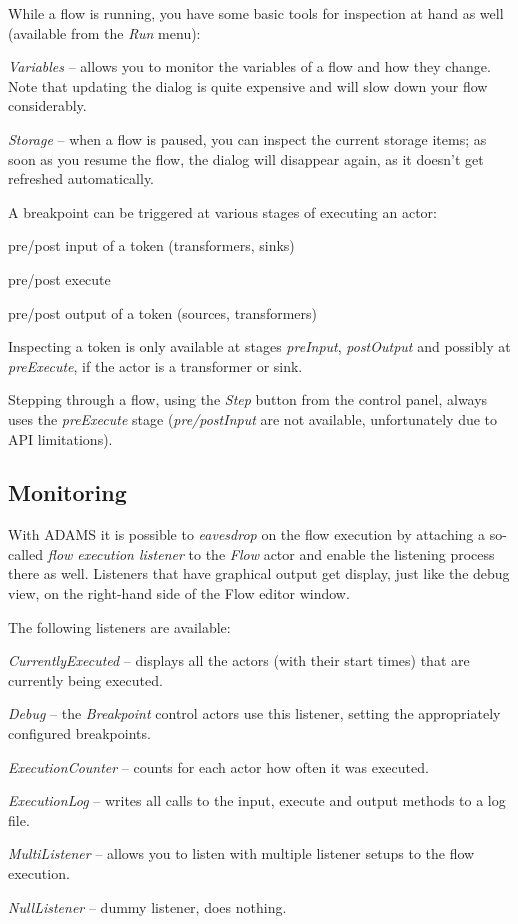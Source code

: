 While a flow is running, you have some basic tools for inspection at hand as 
well (available from the \textit{Run} menu):
\begin{tight_itemize}
	\item \textit{Variables} -- allows you to monitor the variables of a flow
	and how they change. Note that updating the dialog is quite expensive and
	will slow down your flow considerably.
	\item \textit{Storage} -- when a flow is paused, you can inspect the 
	current storage items; as soon as you resume the flow, the dialog will 
	disappear again, as it doesn't get refreshed automatically.
\end{tight_itemize}
A breakpoint can be triggered at various stages of executing an actor:
\begin{tight_itemize}
  \item pre/post input of a token (transformers, sinks)
  \item pre/post execute
  \item pre/post output of a token (sources, transformers)
\end{tight_itemize}
Inspecting a token is only available at stages \textit{preInput},
\textit{postOutput} and possibly at \textit{preExecute}, if the
actor is a transformer or sink.

Stepping through a flow, using the \textit{Step} button 
from the control panel, always uses the \textit{preExecute} stage (\textit{pre/postInput}
are not available, unfortunately due to API limitations).

\subsection{Monitoring}
With ADAMS it is possible to \textit{eavesdrop} on the flow execution by 
attaching a so-called \textit{flow execution listener} to the \textit{Flow}
actor and enable the listening process there as well. Listeners that have
graphical output get display, just like the debug view, on the right-hand
side of the Flow editor window.

The following listeners are available:
\begin{tight_itemize}
	\item \textit{CurrentlyExecuted} -- displays all the actors (with their 
	start times) that are currently being executed.
	\item \textit{Debug} -- the \textit{Breakpoint} control actors use
	this listener, setting the appropriately configured breakpoints.
	\item \textit{ExecutionCounter} -- counts for each actor how often it was
	executed.
	\item \textit{ExecutionLog} -- writes all calls to the input, execute 
	and output methods to a log file.
	\item \textit{MultiListener} -- allows you to listen with multiple 
	listener setups to the flow execution.
	\item \textit{NullListener} -- dummy listener, does nothing.
\end{tight_itemize}


